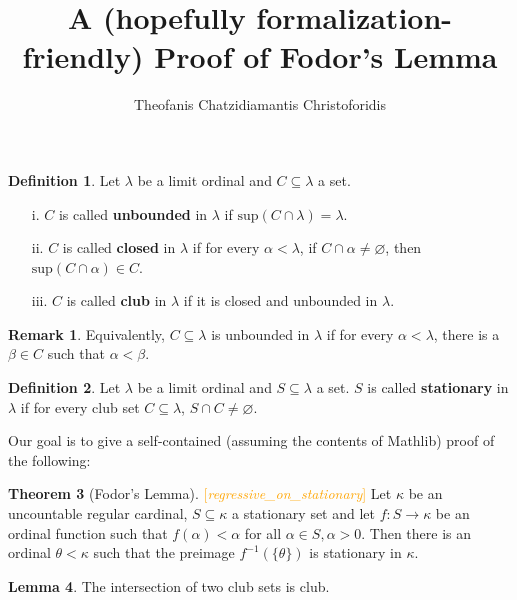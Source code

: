 \documentclass[11pt]{article}
\title{A (hopefully formalization-friendly) Proof of Fodor's Lemma}
\author{Theofanis Chatzidiamantis Christoforidis}
\date{}
\theoremstyle{definition}
\newtheorem{defin}{Definition}
\newtheorem{lem}[defin]{Lemma}
\newtheorem{thm}[defin]{Theorem}
\newtheorem{rem}{Remark}[defin]
\newcommand{\sup}{\text{sup}}
\begin{document}
\maketitle

\begin{defin}
    Let $\lambda$ be a limit ordinal and $C\subseteq \lambda$ a set.
    \begin{enumerate} \itemsep0.2em
        \item[i.]  $C$ is called \textbf{unbounded} in $\lambda$ if $\sup (C\cap \lambda)=\lambda$.
        \item[ii.] $C$ is called \textbf{closed} in $\lambda$ if for every $\alpha < \lambda$,
        if $C\cap\alpha\neq\varnothing$, then $\sup (C\cap\alpha)\in C$.
        \item[iii.] $C$ is called \textbf{club} in $\lambda$ if it is closed and unbounded
        in $\lambda$.
    \end{enumerate}
\end{defin}

\begin{rem}
    Equivalently, $C\subseteq\lambda$ is unbounded in $\lambda$ if for every $\alpha < \lambda$,
        there is a $\beta\in C$ such that $\alpha<\beta$.
\end{rem}

\begin{defin}
    Let $\lambda$ be a limit ordinal and $S\subseteq \lambda$ a set. $S$ is called
    \textbf{stationary} in $\lambda$ if for every club set $C\subseteq\lambda$,
    $S\cap C\neq\varnothing$.
\end{defin}

Our goal is to give a self-contained (assuming the contents of Mathlib) proof of the following:
\begin{thm}[Fodor's Lemma] \textcolor{orange}{[\textit{regressive\_on\_stationary}]}
   \newline Let $\kappa$ be an uncountable regular cardinal, $S\subseteq\kappa$ a
   stationary set and let $f:S\rightarrow \kappa$ be an ordinal function such
   that $f(\alpha)<\alpha$ for all $\alpha\in S, \alpha>0$. Then there is an ordinal
   $\theta <\kappa$ such that the preimage $f^{-1}(\{\theta\})$ is stationary in $\kappa$.
\end{thm}

\begin{lem}
    The intersection of two club sets is club.
\end{lem}
\end{document}
